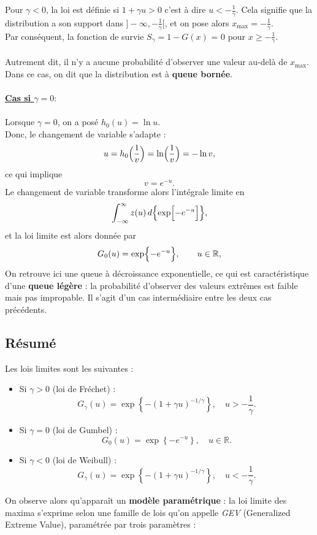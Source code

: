 \documentclass{article}
\theoremstyle{plain}
\theoremstyle{definition}
\theoremstyle{plain}
\begin{document}
Pour \(\gamma < 0\), la loi est définie si $1 + \gamma u > 0$ c'est à dire $u < - \frac{1}{\gamma}$. Cela signifie que la distribution a son support dans \(]-\infty, - \frac{1}{\gamma} [ \), et on pose alors \(x_{\max} = - \frac{1}{\gamma} \).
\\
Par conséquent, la fonction de survie $S_{\gamma} = 1 - G(x)$ = 0 pour \(x \ge - \frac{1}{\gamma} \).
\\
\\
Autrement dit, il n'y a aucune probabilité d'observer une valeur au-delà de \(x_{\max}\). Dans ce cas, on dit que la distribution est à \textbf{queue bornée}.
\\
\\
\textbf{\underline{Cas si \(\gamma=0 : \)}}
\\
\\
Lorsque \(\gamma = 0\), on a posé $h_0(u)=\ln u$.
\\
Donc, le changement de variable s'adapte : 
\[
u=h_0\Bigl(\frac{1}{v}\Bigr)=\ln\Bigl(\frac{1}{v}\Bigr)=-\ln v,
\]
ce qui implique
\[
v=e^{-u}.
\]
Le changement de variable transforme alors l'intégrale limite en
\[
\int_{-\infty}^{\infty} z(u)\,d\Bigl\{\exp\Bigl[-e^{-u}\Bigr]\Bigr\},
\]
et la loi limite est alors donnée par
\[
G_0(u)=\exp\Bigl\{-e^{-u}\Bigr\},\qquad u\in\mathbb{R},
\]
On retrouve ici une queue à décroissance exponentielle, ce qui est caractéristique d'une \textbf{queue légère} : la probabilité d'observer des valeurs extrêmes est faible mais pas impropable.
Il s'agit d'un cas intermédiaire entre les deux cas précédents.
\\
\subsection{Résumé}
Les lois limites sont les suivantes :
\\
\begin{itemize}
    \item Si \(\gamma>0\) (loi de Fréchet) :
    \[
    G_\gamma(u)=\exp\left\{-\left(1+\gamma u\right)^{-1/\gamma}\right\}, \quad u > -\frac{1}{\gamma}.
    \]
    
    \item Si \(\gamma=0\) (loi de Gumbel) :
    \[
    G_0(u)=\exp\left\{-e^{-u}\right\}, \quad u\in\mathbb{R}.
    \]
    
    \item Si \(\gamma<0\) (loi de Weibull) :
    \[
    G_\gamma(u)=\exp\left\{-\left(1+\gamma u\right)^{-1/\gamma}\right\}, \quad u < -\frac{1}{\gamma}.
    \]
\end{itemize}
On observe alors qu’apparaît un \textbf{modèle paramétrique} : la loi limite des maxima s’exprime selon une famille de lois qu’on appelle \emph{GEV} (Generalized Extreme Value), paramétrée par trois paramètres :
\end{document}
